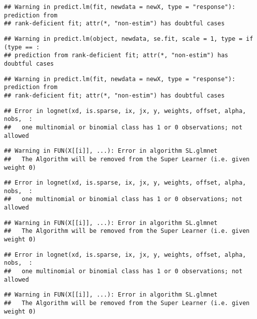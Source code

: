 \documentclass[
]{article}
\begin{document}
\begin{verbatim}
## Warning in predict.lm(fit, newdata = newX, type = "response"): prediction from
## rank-deficient fit; attr(*, "non-estim") has doubtful cases
\end{verbatim}

\begin{verbatim}
## Warning in predict.lm(object, newdata, se.fit, scale = 1, type = if (type == :
## prediction from rank-deficient fit; attr(*, "non-estim") has doubtful cases
\end{verbatim}

\begin{verbatim}
## Warning in predict.lm(fit, newdata = newX, type = "response"): prediction from
## rank-deficient fit; attr(*, "non-estim") has doubtful cases
\end{verbatim}

\begin{verbatim}
## Error in lognet(xd, is.sparse, ix, jx, y, weights, offset, alpha, nobs,  : 
##   one multinomial or binomial class has 1 or 0 observations; not allowed
\end{verbatim}

\begin{verbatim}
## Warning in FUN(X[[i]], ...): Error in algorithm SL.glmnet 
##   The Algorithm will be removed from the Super Learner (i.e. given weight 0)
\end{verbatim}

\begin{verbatim}
## Error in lognet(xd, is.sparse, ix, jx, y, weights, offset, alpha, nobs,  : 
##   one multinomial or binomial class has 1 or 0 observations; not allowed
\end{verbatim}

\begin{verbatim}
## Warning in FUN(X[[i]], ...): Error in algorithm SL.glmnet 
##   The Algorithm will be removed from the Super Learner (i.e. given weight 0)
\end{verbatim}

\begin{verbatim}
## Error in lognet(xd, is.sparse, ix, jx, y, weights, offset, alpha, nobs,  : 
##   one multinomial or binomial class has 1 or 0 observations; not allowed
\end{verbatim}

\begin{verbatim}
## Warning in FUN(X[[i]], ...): Error in algorithm SL.glmnet 
##   The Algorithm will be removed from the Super Learner (i.e. given weight 0)
\end{verbatim}
\end{document}
